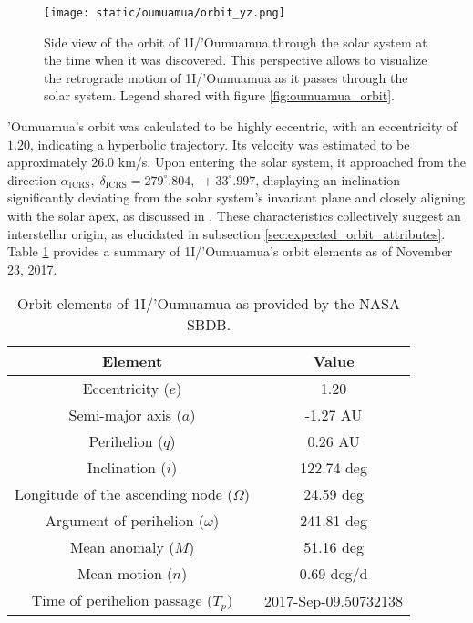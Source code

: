 \begin{figure}[H]
  \centering
  \texttt{[image: static/oumuamua/orbit\_yz.png]}
  \caption[Side view of the orbit of 1I/'Oumuamua through the solar system]
  {
    Side view of the orbit of 1I/'Oumuamua through the solar system at the time when it was
    discovered. This perspective allows to visualize the retrograde motion of
    1I/'Oumuamua as it passes through the solar system. Legend shared with
    figure \ref{fig:oumuamua_orbit}.
  }
  \label{fig:oumuamua_orbit_yz}
\end{figure}

'Oumuamua's orbit was calculated to be highly eccentric, with an eccentricity of
$1.20$, indicating a hyperbolic trajectory. Its velocity was estimated to be
approximately $26.0$ km/s. Upon entering the solar system, it approached from
the direction $\alpha_{\text{ICRS}},\; \delta_{\text{ICRS}} = 279^\circ.804,\;
  +33^\circ.997$, displaying an inclination significantly deviating from the solar
system's invariant plane and closely aligning with the solar apex, as discussed
in \cite{mamajek2017}. These characteristics collectively suggest an
interstellar origin, as elucidated in subsection
\ref{sec:expected_orbit_attributes}. Table \ref{tab:oumuamua_elements} provides
a summary of 1I/'Oumuamua's orbit elements as of November 23, 2017.

\begin{table}[H]
  \centering
  \begin{tabular}{|c|c|}
    \hline
    Element                                    & Value                \\
    \hline
    Eccentricity ($e$)                         & 1.20                 \\
    Semi-major axis ($a$)                      & -1.27 AU             \\
    Perihelion ($q$)                           & 0.26 AU              \\
    Inclination ($i$)                          & 122.74 deg           \\
    Longitude of the ascending node ($\Omega$) & 24.59 deg            \\
    Argument of perihelion ($\omega$)          & 241.81 deg           \\
    Mean anomaly ($M$)                         & 51.16 deg            \\
    Mean motion ($n$)                          & 0.69 deg/d           \\
    Time of perihelion passage ($T_p$)         & 2017-Sep-09.50732138 \\
    \hline
  \end{tabular}
  \caption{Orbit elements of 1I/'Oumuamua as provided by the NASA SBDB.}
  \label{tab:oumuamua_elements}
\end{table}

